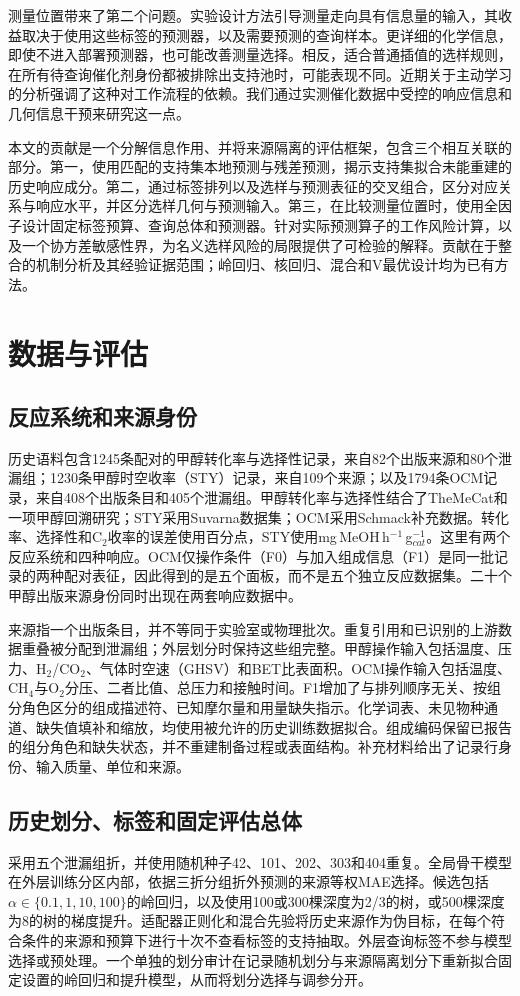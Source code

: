 \documentclass[11pt]{article}
\newcommand{\styunit}{mg\,MeOH\,h$^{-1}$\,g$_{cat}^{-1}$}
\begin{document}
测量位置带来了第二个问题。实验设计方法引导测量走向具有信息量的输入\cite{yubi,gorodetsky2016}，其收益取决于使用这些标签的预测器，以及需要预测的查询样本。更详细的化学信息，即使不进入部署预测器，也可能改善测量选择。相反，适合普通插值的选样规则，在所有待查询催化剂身份都被排除出支持池时，可能表现不同。近期关于主动学习的分析强调了这种对工作流程的依赖\cite{nair2026,tang2026}。我们通过实测催化数据中受控的响应信息和几何信息干预来研究这一点。

本文的贡献是一个分解信息作用、并将来源隔离的评估框架，包含三个相互关联的部分。第一，使用匹配的支持集本地预测与残差预测，揭示支持集拟合未能重建的历史响应成分。第二，通过标签排列以及选样与预测表征的交叉组合，区分对应关系与响应水平，并区分选样几何与预测输入。第三，在比较测量位置时，使用全因子设计固定标签预算、查询总体和预测器。针对实际预测算子的工作风险计算，以及一个协方差敏感性界，为名义选样风险的局限提供了可检验的解释。贡献在于整合的机制分析及其经验证据范围；岭回归、核回归、混合和V最优设计均为已有方法。

\section{数据与评估}
\subsection{反应系统和来源身份}
历史语料包含1245条配对的甲醇转化率与选择性记录，来自82个出版来源和80个泄漏组；1230条甲醇时空收率（STY）记录，来自109个来源；以及1794条OCM记录，来自408个出版条目和405个泄漏组。甲醇转化率与选择性结合了TheMeCat和一项甲醇回溯研究\cite{toldy,yan}；STY采用Suvarna数据集\cite{suvarna}；OCM采用Schmack补充数据\cite{schmack}。转化率、选择性和C$_2$收率的误差使用百分点，STY使用\styunit。这里有两个反应系统和四种响应。OCM仅操作条件（F0）与加入组成信息（F1）是同一批记录的两种配对表征，因此得到的是五个面板，而不是五个独立反应数据集。二十个甲醇出版来源身份同时出现在两套响应数据中。

来源指一个出版条目，并不等同于实验室或物理批次。重复引用和已识别的上游数据重叠被分配到泄漏组；外层划分时保持这些组完整。甲醇操作输入包括温度、压力、H$_2$/CO$_2$、气体时空速（GHSV）和BET比表面积。OCM操作输入包括温度、CH$_4$与O$_2$分压、二者比值、总压力和接触时间。F1增加了与排列顺序无关、按组分角色区分的组成描述符、已知摩尔量和用量缺失指示。化学词表、未见物种通道、缺失值填补和缩放，均使用被允许的历史训练数据拟合。组成编码保留已报告的组分角色和缺失状态，并不重建制备过程或表面结构。补充材料给出了记录行身份、输入质量、单位和来源。

\subsection{历史划分、标签和固定评估总体}
采用五个泄漏组折，并使用随机种子42、101、202、303和404重复。全局骨干模型在外层训练分区内部，依据三折分组折外预测的来源等权MAE选择。候选包括$\alpha\in\{0.1,1,10,100\}$的岭回归，以及使用100或300棵深度为2/3的树，或500棵深度为8的树的梯度提升。适配器正则化和混合先验将历史来源作为伪目标，在每个符合条件的来源和预算下进行十次不查看标签的支持抽取。外层查询标签不参与模型选择或预处理。一个单独的划分审计在记录随机划分与来源隔离划分下重新拟合固定设置的岭回归和提升模型，从而将划分选择与调参分开。
\end{document}
